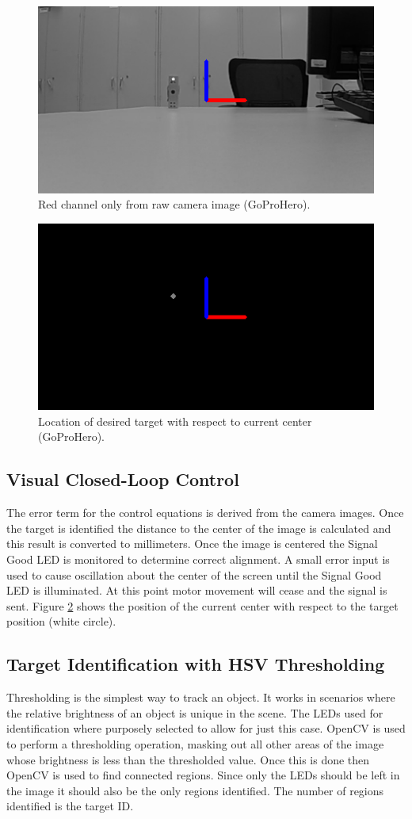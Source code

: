 \documentclass[botnum, fleqn]{unmeethesis}
\begin{document}
\begin{figure}[ht]
 \begin{center}
  \includegraphics[width=0.5 \textwidth]{figures/bw.png}
  \caption{\small \label{fig:bw} Red channel only from raw camera image (GoProHero).}
 \end{center}
\end{figure}

\begin{figure}[ht]
 \begin{center}
  \includegraphics[width=0.5 \textwidth]{figures/dot.png}
  \caption{\small \label{fig:dot} Location of desired target with respect to current center (GoProHero).}
 \end{center}
\end{figure}


\subsection*{Visual Closed-Loop Control}

The error term for the control equations is derived from the camera images. Once the target is identified the distance to the center of the image is calculated and this result is converted to millimeters. Once the image is centered the Signal Good LED is monitored to determine correct alignment. A small error input is used to cause oscillation about the center of the screen until the Signal Good LED is illuminated. At this point motor movement will cease and the signal is sent. Figure \ref{fig:dot} shows the position of the current center with respect to the target position (white circle).


\subsection*{Target Identification with HSV Thresholding}
Thresholding is the simplest way to track an object. It works in scenarios where the relative brightness of an object is unique in the scene. The LEDs used for identification where purposely selected to allow for just this case. OpenCV is used to perform a thresholding operation, masking out all other areas of the image whose brightness is less than the thresholded value. Once this is done then OpenCV is used to find connected regions. Since only the LEDs should be left in the image it should also be the only regions identified. The number of regions identified is the target ID. 
\end{document}
